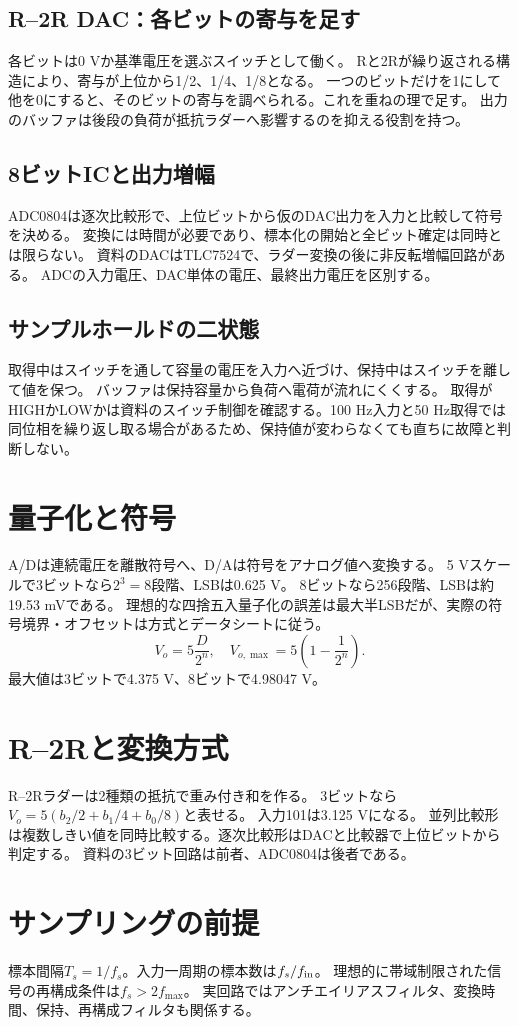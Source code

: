 \documentclass[lualatex,a4paper,10pt]{jlreq}
\begin{document}
\subsection{R--2R DAC：各ビットの寄与を足す}
各ビットは0 Vか基準電圧を選ぶスイッチとして働く。
Rと2Rが繰り返される構造により、寄与が上位から1/2、1/4、1/8となる。
一つのビットだけを1にして他を0にすると、そのビットの寄与を調べられる。これを重ねの理で足す。
出力のバッファは後段の負荷が抵抗ラダーへ影響するのを抑える役割を持つ。
\clearpage
\subsection{8ビットICと出力増幅}
ADC0804は逐次比較形で、上位ビットから仮のDAC出力を入力と比較して符号を決める。
変換には時間が必要であり、標本化の開始と全ビット確定は同時とは限らない。
資料のDACはTLC7524で、ラダー変換の後に非反転増幅回路がある。
ADCの入力電圧、DAC単体の電圧、最終出力電圧を区別する。
\subsection{サンプルホールドの二状態}
取得中はスイッチを通して容量の電圧を入力へ近づけ、保持中はスイッチを離して値を保つ。
バッファは保持容量から負荷へ電荷が流れにくくする。
取得がHIGHかLOWかは資料のスイッチ制御を確認する。100 Hz入力と50 Hz取得では同位相を繰り返し取る場合があるため、保持値が変わらなくても直ちに故障と判断しない。

\section{量子化と符号}\label{sec:auto3}
A/Dは連続電圧を離散符号へ、D/Aは符号をアナログ値へ変換する。
5 Vスケールで3ビットなら$2^3=8$段階、LSBは0.625 V。
8ビットなら256段階、LSBは約19.53 mVである。
理想的な四捨五入量子化の誤差は最大半LSBだが、実際の符号境界・オフセットは方式とデータシートに従う。
\[
 V_o=5\frac D{2^n},\quad V_{o,\max}=5\left(1-\frac1{2^n}\right).
\]
最大値は3ビットで4.375 V、8ビットで4.98047 V。
\section{R--2Rと変換方式}\label{sec:auto4}
R--2Rラダーは2種類の抵抗で重み付き和を作る。
3ビットなら$V_o=5(b_2/2+b_1/4+b_0/8)$と表せる。
入力101は3.125 Vになる。
並列比較形は複数しきい値を同時比較する。逐次比較形はDACと比較器で上位ビットから判定する。
資料の3ビット回路は前者、ADC0804は後者である。
\section{サンプリングの前提}\label{sec:auto5}
標本間隔$T_s=1/f_s$。入力一周期の標本数は$f_s/f_{\rm in}$。
理想的に帯域制限された信号の再構成条件は$f_s>2f_{\max}$。
実回路ではアンチエイリアスフィルタ、変換時間、保持、再構成フィルタも関係する。
\clearpage
\end{document}
